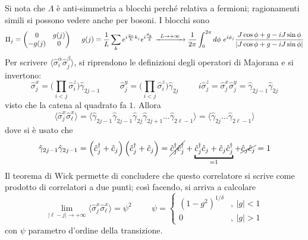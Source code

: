 \documentclass[11pt, a4paper]{scrartcl}
\theoremstyle{style}
\theoremstyle{style1}
\numberwithin{equation}{subsection}
\begin{document}
Si nota che $\Lambda $ \`e anti-simmetria a blocchi perch\'e relativa a fermioni; ragionamenti simili si possono vedere anche per bosoni.
I blocchi sono
\[
	\Pi_j = \begin{pmatrix} 0 & g(j) \\ - g(j) & 0  \end{pmatrix}  \hspace{.5cm} g(j) = \frac{1}{L}\sum_{k}^{} e^{i \frac{2\pi}{L}k_j}e^{i \frac{\theta _k}{2}}\xrightarrow{\, \ L\to +\infty \ \, } \frac{1}{2\pi} \int _0^{2\pi} d\phi  \ e^{i \phi_j} \frac{J \cos \phi  + g - i J \sin\phi }{\lvert J \cos \phi  + g - i J \sin \phi  \rvert }
\] 
Per scrivere $\langle \hat{\sigma}^\alpha  _i \hat{\sigma }_j^\beta \rangle$, si riprendono le definizioni degli operatori di Majorana e si invertono:
\[
\hat{\sigma }_j^x = \bigg(\prod_{i < j} \hat{\sigma }_i^z\bigg) \hat{\gamma}_{2j-1} \hspace{1cm}\hat{\sigma }_j^y = \bigg(\prod_{i < j} \hat{\sigma }_i^z\bigg) \hat{\gamma}_{2j}  \hspace{1cm} i \hat{\sigma }_j^z = \hat{\sigma }_j^x \hat{\sigma }_j^y = \hat{\gamma}_{2j-1} \hat{\gamma}_{2j} 
\] 
visto che la catena al quadrato fa $1$.
Allora
\[
\langle \hat{\sigma }^x_j \hat{\sigma }_\ell ^x \rangle= \big\langle \hat{\gamma}_{2j-1} \hat{\gamma}_{2j-1} \hat{\gamma}_{2j}  \hat{\gamma}_{2j+1} \ldots \hat{\gamma}_{2\ell  -1}   \big\rangle=\big\langle \hat{\gamma}_{2j} \ldots \hat{\gamma}_{2\ell -1}  \big\rangle
\] 
dove si \`e usato che
\[
	\hat{\gamma}_{2j-1} \hat{\gamma}_{2j-1} = \left(\hat{c}^\dagger _j + \hat{c}_j\right) \left(\hat{c}_j^\dagger + \hat{c}_j\right)  = \cancel{\hat{c}_j^\dagger \hat{c}_j^\dagger} + \underbracket{\hat{c}_j ^\dagger \hat{c}_j + \hat{c}_j \hat{c}_j ^\dagger}_{=1}   +\cancel{ \hat{c}_j \hat{c}_j}= 1
\] 
Il teorema di Wick permette di concludere che questo correlatore si scrive come prodotto di correlatori a due punti; cos\`i facendo, si arriva a calcolare
\[
\lim_{\lvert \ell -j \rvert  \to +\infty} \langle \hat{\sigma }_j^x \hat{\sigma }_\ell ^x \rangle = \psi ^2 \hspace{1cm} \psi  = \begin{cases}
	(1-g^2 ) ^{1 / \delta } &,\ \lvert g \rvert <1\\
	0&,\ \lvert g \rvert >1
\end{cases}
\] 
con $\psi $ parametro d'ordine della transizione.
\end{document}
